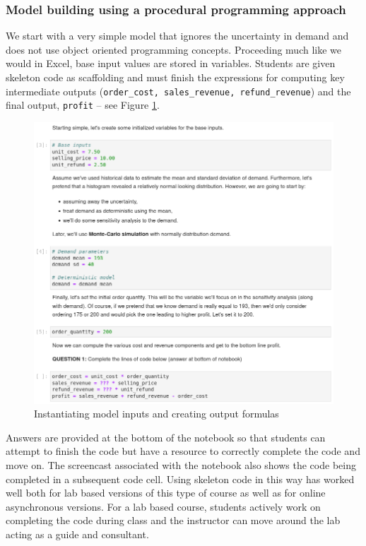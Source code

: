 \documentclass[ited,blindrev]{informs3}              %
\newcommand{\code}[1]{\texttt{#1}}
\begin{document}
\subsubsection{Model building using a procedural programming approach}
 
We start with a very simple model that ignores the uncertainty in demand and does not use object oriented programming concepts. Proceeding much like we would in Excel, base input values are stored in variables. Students are given skeleton code as scaffolding and must finish the expressions for computing key intermediate outputs (\code{order\_cost, sales\_revenue, refund\_revenue}) and the final output, \code{profit} -- see Figure \ref{fig:model_inputs}.


\begin{figure}[!htbp]
\centering
\includegraphics[scale=0.5]{model_inputs}
\caption{Instantiating model inputs and creating output formulas}
\label{fig:model_inputs}
\end{figure}

Answers are provided at the bottom of the notebook so that students can attempt to finish the code but have a resource to correctly complete the code and move on. The screencast associated with the notebook also shows the code being completed in a subsequent code cell. Using skeleton code in this way has worked well both for lab based versions of this type of course as well as for online asynchronous versions. For a lab based course, students actively work on completing the code during class and the instructor can move around the lab acting as a guide and consultant.
\end{document}
